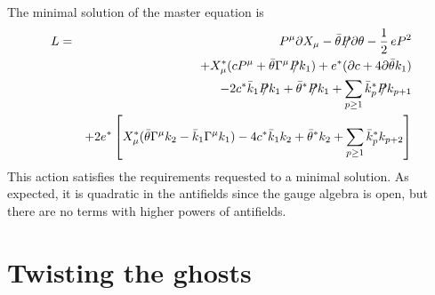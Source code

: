 \documentclass[a4paper,12pt]{article}
\begin{document}
The minimal solution of the master equation is \cite{Lindstrom_BS}
\begin{eqnarray}
 L & = & P^\mu \partial X_\mu - \bar\theta \SL{P} \partial\theta -{1
   \over 2}\, e 
   P^2 \nonumber \\
 && + X_\mu ^* (c P^\mu + \bar \theta \Gamma^\mu \SL{P} k_1 ) + e^*
 (\partial c + 4 \partial \bar \theta k_1 ) \nonumber \\
&& -2 c^* \bar k_1 \SL{P} k_1 + \bar\theta^* \SL{P} k_1 + \sum_{p \geq 1} 
\bar k_p^* \SL{P} k_{p+1} \nonumber \\
&& + 2 e^* \left[ X_\mu^*(\bar\theta \Gamma^\mu k_2 - \bar k_1
  \Gamma^\mu k_1) -4 c^* \bar k_1 k_2 + \bar \theta^* k_2 + \sum_{p
    \geq 1} \bar k_p^* k_{p+2} \right] 
\end{eqnarray}
This action satisfies the requirements requested to a minimal
solution. As expected, it is quadratic in the antifields since the
gauge algebra is open, but there are no terms with higher powers of
antifields.  


\section{Twisting the ghosts}
\label{sec:twist}
\end{document}
